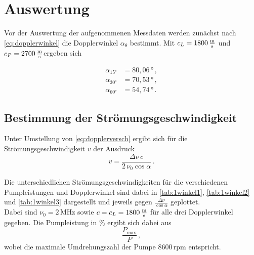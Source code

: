 \section{Auswertung}
\label{sec:auswertung}

Vor der Auswertung der aufgenommenen Messdaten werden zunächst nach \eqref{eq:dopplerwinkel} die Dopplerwinkel $\alpha_\theta$ bestimmt.
Mit $c_L = 1800 \,\unit{\frac{\meter}{\second}}$ und $c_P = 2700 \,\unit{\frac{\meter}{\second}}$ergeben sich

\begin{align*}
    \alpha_{15°} &= 80,06 \,° \,,\\
    \alpha_{30°} &= 70,53 \,° \,,\\
    \alpha_{60°} &= 54,74 \,° \,. 
\end{align*}

\subsection{Bestimmung der Strömungsgeschwindigkeit}

Unter Umstellung von \eqref{eq:dopplerversch} ergibt sich für die Strömungsgeschwindigkeit $v$ der Ausdruck
\begin{equation}
    v = \frac{\Delta\nu \,c}{2 \,\nu_0 \cos\alpha} \,.
    \label{eq:momgeschwi}
\end{equation}

Die unterschiedlichen Strömungsgeschwindigkeiten für die verschiedenen Pumpleistungen und Dopplerwinkel sind dabei in \autoref{tab:1winkel1}, \autoref{tab:1winkel2} und \autoref{tab:1winkel3} dargestellt und jeweils gegen  
$\frac{\Delta\nu}{\cos\alpha}$ geplottet. \\

Dabei sind $\nu_0 = 2 \,\unit{\mega\hertz}$ sowie $c = c_L = 1800 \,\unit{\frac{\meter}{\second}}$ für alle drei Dopplerwinkel gegeben.
Die Pumpleistung in $\%$ ergibt sich dabei aus
\begin{equation*}
    \frac{P_{\text{max}}}{P} \,,
\end{equation*}
wobei die maximale Umdrehungszahl der Pumpe $8600 \, \text{rpm}$ entspricht. \\


